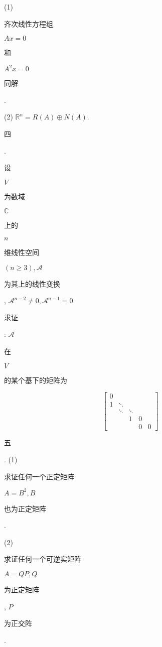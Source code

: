 \documentclass[10pt]{article}
\begin{document}
(1) \begin{CJK}{UTF8}{mj}齐次线性方程组\end{CJK} $A x=0$ \begin{CJK}{UTF8}{mj}和\end{CJK} $A^{2} x=0$ \begin{CJK}{UTF8}{mj}同解\end{CJK}.

(2) $\mathbb{R}^{n}=R(A) \oplus N(A)$.

\begin{CJK}{UTF8}{mj}四\end{CJK}. \begin{CJK}{UTF8}{mj}设\end{CJK} $V$ \begin{CJK}{UTF8}{mj}为数域\end{CJK} $\mathbb{C}$ \begin{CJK}{UTF8}{mj}上的\end{CJK} $n$ \begin{CJK}{UTF8}{mj}维线性空间\end{CJK} $(n \geq 3), \mathscr{A}$ \begin{CJK}{UTF8}{mj}为其上的线性变换\end{CJK}, $\mathscr{A}^{n-2} \neq 0, \mathscr{A}^{n-1}=0$. \begin{CJK}{UTF8}{mj}求证\end{CJK}: $\mathscr{A}$ \begin{CJK}{UTF8}{mj}在\end{CJK} $V$ \begin{CJK}{UTF8}{mj}的某个基下的矩阵为\end{CJK}
$$
\left[\begin{array}{lllll}
0 & & & & \\
1 & \ddots & & & \\
& \ddots & \ddots & & \\
& & 1 & 0 & \\
& & & 0 & 0
\end{array}\right]
$$
\begin{CJK}{UTF8}{mj}五\end{CJK}. (1) \begin{CJK}{UTF8}{mj}求证任何一个正定矩阵\end{CJK} $A=B^{2}, B$ \begin{CJK}{UTF8}{mj}也为正定矩阵\end{CJK}.

(2) \begin{CJK}{UTF8}{mj}求证任何一个可逆实矩阵\end{CJK} $A=Q P, Q$ \begin{CJK}{UTF8}{mj}为正定矩阵\end{CJK}, $P$ \begin{CJK}{UTF8}{mj}为正交阵\end{CJK}.
\end{document}
